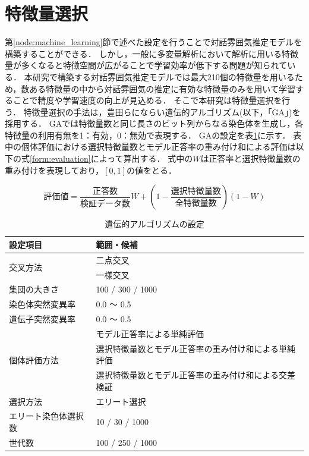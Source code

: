 \section{特徴量選択\label{node:ga}}

第\ref{node:machine_learning}節で述べた設定を行うことで対話雰囲気推定モデルを構築することができる．
しかし，一般に多変量解析において解析に用いる特徴量が多くなると特徴空間が広がることで学習効率が低下する問題が知られている．
本研究で構築する対話雰囲気推定モデルでは最大210個の特徴量を用いるため，数ある特徴量の中から対話雰囲気の推定に有効な特徴量のみを用いて学習することで精度や学習速度の向上が見込める．
そこで本研究は特徴量選択を行う．
特徴量選択の手法は，豊田らにならい遺伝的アルゴリズム(以下，「GA」)を採用する．
GAでは特徴量数と同じ長さのビット列からなる染色体を生成し，各特徴量の利用有無を1：有効，0：無効で表現する．
GAの設定を表\ref{tab:ga_setting}に示す．
表中の個体評価における選択特徴量数とモデル正答率の重み付け和による評価は以下の式\ref{form:evaluation}によって算出する．
式中の$W$は正答率と選択特徴量数の重み付けを表現しており，$[0, 1]$の値をとる．

\begin{equation}
    \label{form:evaluation}
    評価値 = \frac{正答数}{検証データ数} W + (1 - \frac{選択特徴量数}{全特徴量数}) (1 - W)
\end{equation}

\begin{table}[t]
    \caption{遺伝的アルゴリズムの設定}
    \centering
    \begin{tabular}{ll}
        \hline
        設定項目 & 範囲・候補 \\ \hline\hline
        \multirow{2}{*}{交叉方法} & 二点交叉 \\
        & 一様交叉 \\ \hline
        集団の大きさ & 100 / 300 / 1000 \\ \hline
        染色体突然変異率 & 0.0 〜 0.5 \\ \hline
        遺伝子突然変異率 & 0.0 〜 0.5 \\ \hline
        \multirow{3}{*}{個体評価方法} & モデル正答率による単純評価 \\
        & 選択特徴量数とモデル正答率の重み付け和による単純評価 \\
        & 選択特徴量数とモデル正答率の重み付け和による交差検証 \\ \hline
        選択方法 & エリート選択 \\ \hline
        エリート染色体選択数 & 10 / 30 / 1000 \\ \hline
        世代数 & 100 / 250 / 1000 \\ \hline
    \end{tabular}
    \label{tab:ga_setting}
\end{table}
